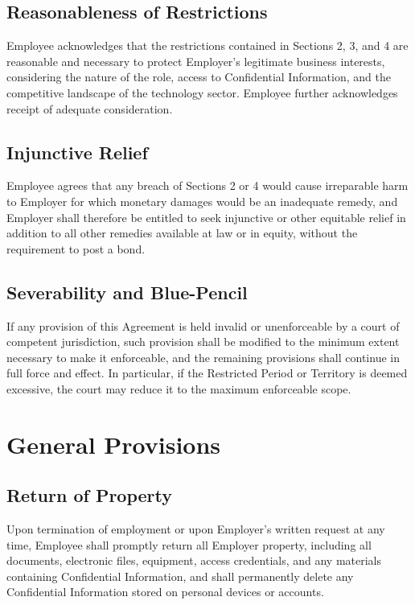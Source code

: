 \documentclass[11pt,a4paper]{article}
\begin{document}
\subsection{Reasonableness of Restrictions}
\noindent
Employee acknowledges that the restrictions contained in Sections 2, 3, and 4 are
reasonable and necessary to protect Employer's legitimate business interests, considering
the nature of the role, access to Confidential Information, and the competitive landscape
of the technology sector. Employee further acknowledges receipt of adequate consideration.

\subsection{Injunctive Relief}
\noindent
Employee agrees that any breach of Sections 2 or 4 would cause irreparable harm to
Employer for which monetary damages would be an inadequate remedy, and Employer shall
therefore be entitled to seek injunctive or other equitable relief in addition to all
other remedies available at law or in equity, without the requirement to post a bond.

\subsection{Severability and Blue-Pencil}
\noindent
If any provision of this Agreement is held invalid or unenforceable by a court of
competent jurisdiction, such provision shall be modified to the minimum extent necessary
to make it enforceable, and the remaining provisions shall continue in full force and
effect. In particular, if the Restricted Period or Territory is deemed excessive, the
court may reduce it to the maximum enforceable scope.

\section{General Provisions}

\subsection{Return of Property}
\noindent
Upon termination of employment or upon Employer's written request at any time, Employee
shall promptly return all Employer property, including all documents, electronic files,
equipment, access credentials, and any materials containing Confidential Information,
and shall permanently delete any Confidential Information stored on personal devices or
accounts.
\end{document}
